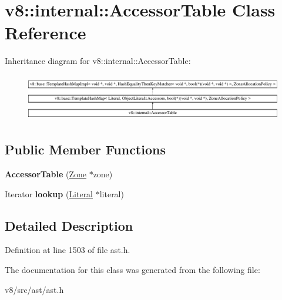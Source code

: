 \hypertarget{classv8_1_1internal_1_1AccessorTable}{}\section{v8\+:\+:internal\+:\+:Accessor\+Table Class Reference}
\label{classv8_1_1internal_1_1AccessorTable}
Inheritance diagram for v8\+:\+:internal\+:\+:Accessor\+Table\+:\begin{figure}[H]
\begin{center}
\leavevmode
\includegraphics[height=2.074074cm]{classv8_1_1internal_1_1AccessorTable}
\end{center}
\end{figure}
\subsection*{Public Member Functions}
\begin{DoxyCompactItemize}
\item 
\mbox{\label{classv8_1_1internal_1_1AccessorTable_adcee86ad1000d3d63e7360d0895fc2ae}} 
{\bfseries Accessor\+Table} (\mbox{\hyperlink{classv8_1_1internal_1_1Zone}{Zone}} $\ast$zone)
\item 
\mbox{\label{classv8_1_1internal_1_1AccessorTable_a064e2528f1da85829d8742c69adaba19}} 
Iterator {\bfseries lookup} (\mbox{\hyperlink{classv8_1_1internal_1_1Literal}{Literal}} $\ast$literal)
\end{DoxyCompactItemize}


\subsection{Detailed Description}


Definition at line 1503 of file ast.\+h.



The documentation for this class was generated from the following file\+:\begin{DoxyCompactItemize}
\item 
v8/src/ast/ast.\+h\end{DoxyCompactItemize}
